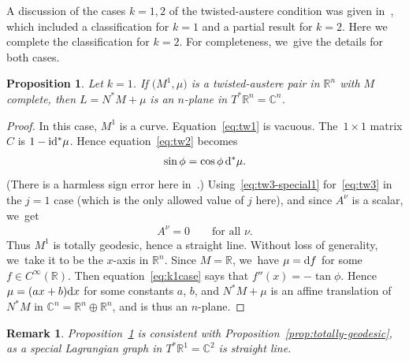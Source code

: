 \documentclass[10pt,a4paper]{amsart}
\def\R{\mathbb{R}}
\def\C{\mathbb{C}}
\def\ri{\mathrm{i}}
\newtheorem{Proposition}[Theorem]{Proposition}
\newtheorem{Remark}[Theorem]{Remark}}
\numberwithin{equation}{section}
\begin{document}
A discussion of the cases $k=1,2$ of the twisted-austere condition was given in~\cite[Section~2]{KL}, which included a classification for $k=1$ and a partial result for $k=2$. Here we complete the classification for $k=2$. For completeness, we~give the details for both cases.

\begin{Proposition} \label{prop:k1}
Let $k=1$. If $\big(M^1, \mu\big)$ is a twisted-austere pair in $\R^n$ with $M$ complete, then $L = N^* M + \mu$ is an $n$-plane in $T^* \R^n = \C^n$.
\end{Proposition}
\begin{proof}
In this case, $M^1$ is a curve. Equation~\eqref{eq:tw1} is vacuous. The~$1 \times 1$ matrix $C$ is $1 - \ri {\rm d}^* \mu$. Hence equation~\eqref{eq:tw2} becomes
\begin{gather} \label{eq:k1case}
\sin \phi = \cos \phi \, {\rm d}^* \mu.
\end{gather}
(There is a harmless sign error here in~\cite{KL}.) Using~\eqref{eq:tw3-special1} for~\eqref{eq:tw3} in the $j=1$ case (which is the only allowed value of $j$ here), and since $A^{\nu}$ is a scalar, we~get
\begin{gather*}
A^{\nu} = 0 \qquad \text{for all $\nu$}.
\end{gather*}
Thus $M^1$ is totally geodesic, hence a straight line. Without loss of generality, we~take it to be the $x$-axis in $\R^n$. Since $M = \R$, we~have $\mu = {\rm d}f$ for some $f \in C^{\infty} (\R)$. Then equation~\eqref{eq:k1case} says that $f''(x) = -\tan \phi$. Hence $\mu = (a x + b) {\rm d}x$ for some constants $a$, $b$, and $N^* M + \mu$ is an affine translation of $N^* M$ in $\C^n = \R^n \oplus \R^n$, and is thus an $n$-plane.
\end{proof}

\begin{Remark} %
Proposition~\ref{prop:k1} is consistent with Proposition~\ref{prop:totally-geodesic}, as a special Lagrangian graph in $T^* \R^1 = \C^2$ is straight line.
\end{Remark}
\end{document}
